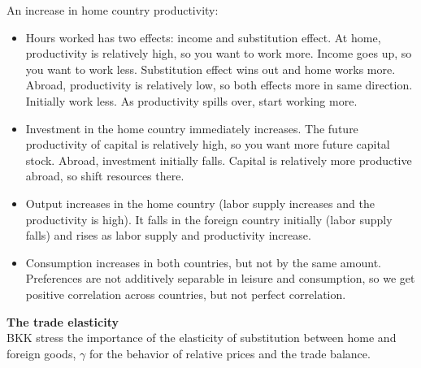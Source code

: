 \documentclass[11pt,pdftex,twoside,letterpaper]{exam}
\begin{document}
An increase in home country productivity:
\begin{itemize}
  \item Hours worked has two effects: income and substitution effect. At home, productivity is relatively high, so you want to work more. Income goes up, so you want to work less. Substitution effect wins out and home works more. Abroad, productivity is relatively low, so both effects more in same direction. Initially work less. As productivity spills over, start working more.
  \item Investment in the home country immediately increases. The future productivity of capital is relatively high, so you want more future capital stock. Abroad, investment initially falls. Capital is relatively more productive abroad, so shift resources there.
  \item Output increases in the home country (labor supply increases and the productivity is high). It falls in the foreign country initially (labor supply falls) and rises as labor supply and productivity increase.
  \item Consumption increases in both countries, but not by the same amount. Preferences are not additively separable in leisure and consumption, so we get positive correlation across countries, but not perfect correlation.
\end{itemize}

\textbf{The trade elasticity}\\
BKK stress the importance of the elasticity of substitution between home and foreign goods, $\gamma$ for the behavior of relative prices and the trade balance.
\end{document}
